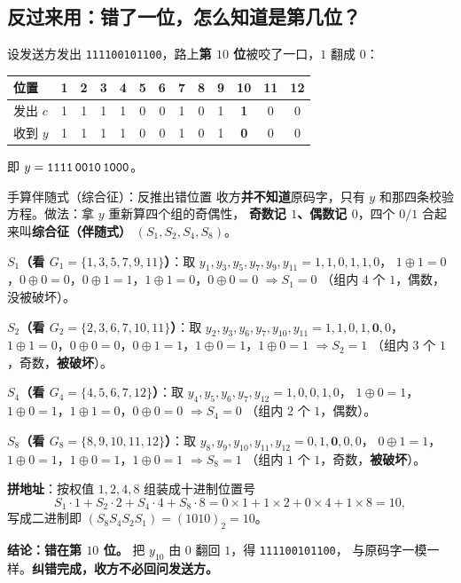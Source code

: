 \documentclass[11pt,a4paper]{ctexart}
\begin{document}
\subsection{反过来用：错了一位，怎么知道是第几位？}

设发送方发出 \texttt{111100101100}，路上\textbf{第 $10$ 位}被咬了一口，$1$ 翻成 $0$：
\begin{center}\small
\setlength{\tabcolsep}{4pt}
\begin{tabular}{@{}l*{12}{c}@{}}
\toprule
位置 & 1&2&3&4&5&6&7&8&9&10&11&12\\
\midrule
发出 $c$ & 1&1&1&1&0&0&1&0&1&\textbf{1}&0&0\\
收到 $y$ & 1&1&1&1&0&0&1&0&1&\textbf{0}&0&0\\
\bottomrule
\end{tabular}
\end{center}
即 $y=\texttt{1111\,0010\,1000}$。

\begin{calc}{手算伴随式（综合征）：反推出错位置}
收方\textbf{并不知道}原码字，只有 $y$ 和那四条校验方程。做法：拿 $y$ 重新算四个组的奇偶性，
\textbf{奇数记 $1$、偶数记 $0$}，四个 $0/1$ 合起来叫\textbf{综合征（伴随式）} $(S_1,S_2,S_4,S_8)$。

\textbf{$S_1$（看 $G_1=\{1,3,5,7,9,11\}$）}：取 $y_1,y_3,y_5,y_7,y_9,y_{11}=1,1,0,1,1,0$，
$1\oplus1=0$，$0\oplus0=0$，$0\oplus1=1$，$1\oplus1=0$，$0\oplus0=0$ $\Rightarrow S_1=0$
（组内 $4$ 个 $1$，偶数，没被破坏）。

\textbf{$S_2$（看 $G_2=\{2,3,6,7,10,11\}$）}：取 $y_2,y_3,y_6,y_7,y_{10},y_{11}=1,1,0,1,\mathbf{0},0$，
$1\oplus1=0$，$0\oplus0=0$，$0\oplus1=1$，$1\oplus0=1$，$1\oplus0=1$ $\Rightarrow S_2=1$
（组内 $3$ 个 $1$，奇数，\textbf{被破坏}）。

\textbf{$S_4$（看 $G_4=\{4,5,6,7,12\}$）}：取 $y_4,y_5,y_6,y_7,y_{12}=1,0,0,1,0$，
$1\oplus0=1$，$1\oplus0=1$，$1\oplus1=0$，$0\oplus0=0$ $\Rightarrow S_4=0$
（组内 $2$ 个 $1$，偶数）。

\textbf{$S_8$（看 $G_8=\{8,9,10,11,12\}$）}：取 $y_8,y_9,y_{10},y_{11},y_{12}=0,1,\mathbf{0},0,0$，
$0\oplus1=1$，$1\oplus0=1$，$1\oplus0=1$，$1\oplus0=1$ $\Rightarrow S_8=1$
（组内 $1$ 个 $1$，奇数，\textbf{被破坏}）。

\textbf{拼地址}：按权值 $1,2,4,8$ 组装成十进制位置号
\[
S_1\cdot1+S_2\cdot2+S_4\cdot4+S_8\cdot8=0\times1+1\times2+0\times4+1\times8=10,
\]
写成二进制即 $(S_8S_4S_2S_1)=(1010)_{2}=10$。

\textbf{结论：错在第 $10$ 位。} 把 $y_{10}$ 由 $0$ 翻回 $1$，得 \texttt{111100101100}，
与原码字一模一样。\textbf{纠错完成，收方不必回问发送方。}
\end{calc}
\end{document}
